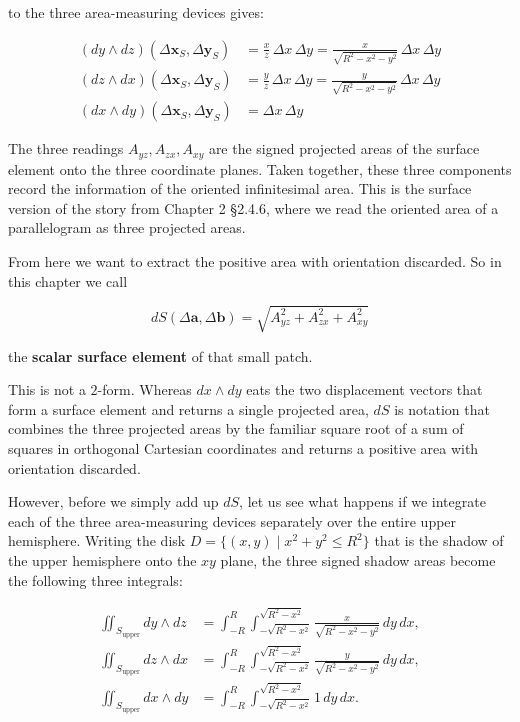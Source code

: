 \documentclass[a4paper,12pt,openany]{book}
\begin{document}
to the three area-measuring devices gives:

\[\begin{aligned}
(dy \wedge dz)(\Delta\mathbf{x}_S,\Delta\mathbf{y}_S) &= \frac{x}{z}\,\Delta x\,\Delta y
= \frac{x}{\sqrt{R^2-x^2-y^2}}\,\Delta x\,\Delta y \\[4pt]
(dz \wedge dx)(\Delta\mathbf{x}_S,\Delta\mathbf{y}_S) &= \frac{y}{z}\,\Delta x\,\Delta y
= \frac{y}{\sqrt{R^2-x^2-y^2}}\,\Delta x\,\Delta y \\[4pt]
(dx \wedge dy)(\Delta\mathbf{x}_S,\Delta\mathbf{y}_S) &= \Delta x\,\Delta y
\end{aligned}\]

The three readings \(A_{yz},A_{zx},A_{xy}\) are the signed projected
areas of the surface element onto the three coordinate planes. Taken
together, these three components record the information of the oriented
infinitesimal area. This is the surface version of the story from
Chapter 2 §2.4.6, where we read the oriented area of a parallelogram as
three projected areas.

From here we want to extract the positive area with orientation
discarded. So in this chapter we call

\[
dS(\Delta\mathbf{a},\Delta\mathbf{b})
= \sqrt{A_{yz}^2+A_{zx}^2+A_{xy}^2}
\]

the \textbf{scalar surface element} of that small patch.

This is not a \(2\)-form. Whereas \(dx\wedge dy\) eats the two
displacement vectors that form a surface element and returns a single
projected area, \(dS\) is notation that combines the three projected
areas by the familiar square root of a sum of squares in orthogonal
Cartesian coordinates and returns a positive area with orientation
discarded.

However, before we simply add up \(dS\), let us see what happens if we
integrate each of the three area-measuring devices separately over the
entire upper hemisphere. Writing the disk
\(D=\{(x,y)\mid x^2+y^2\le R^2\}\) that is the shadow of the upper
hemisphere onto the \(xy\) plane, the three signed shadow areas become
the following three integrals:

\[\begin{aligned}
\iint_{S_{\text{upper}}} dy\wedge dz
&= \int_{-R}^{R}\int_{-\sqrt{R^2-x^2}}^{\sqrt{R^2-x^2}}
\frac{x}{\sqrt{R^2-x^2-y^2}}\,dy\,dx, \\[4pt]
\iint_{S_{\text{upper}}} dz\wedge dx
&= \int_{-R}^{R}\int_{-\sqrt{R^2-x^2}}^{\sqrt{R^2-x^2}}
\frac{y}{\sqrt{R^2-x^2-y^2}}\,dy\,dx, \\[4pt]
\iint_{S_{\text{upper}}} dx\wedge dy
&= \int_{-R}^{R}\int_{-\sqrt{R^2-x^2}}^{\sqrt{R^2-x^2}}
1\,dy\,dx.
\end{aligned}\]
\end{document}
